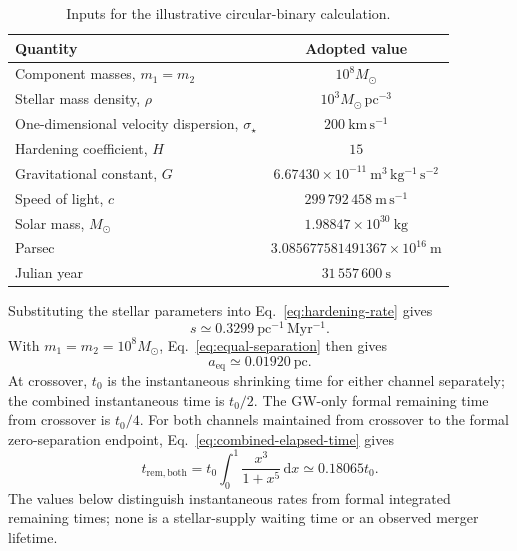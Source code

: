 \documentclass[12pt]{article}
\begin{document}
\begin{table}[ht]
  \centering
  \caption{Inputs for the illustrative circular-binary calculation.}
  \label{tab:inputs}
  \begin{tabular}{lc}
    \toprule
    Quantity & Adopted value \\
    \midrule
    Component masses, $m_1=m_2$ & $10^8 M_\odot$ \\
    Stellar mass density, $\rho$ & $10^3 M_\odot\,\mathrm{pc}^{-3}$ \\
    One-dimensional velocity dispersion, $\sigma_\star$ & $200\ \mathrm{km\,s^{-1}}$ \\
    Hardening coefficient, $H$ & $15$ \\
    Gravitational constant, $G$ & $6.67430\times10^{-11}\ \mathrm{m^3\,kg^{-1}\,s^{-2}}$ \\
    Speed of light, $c$ & $299\,792\,458\ \mathrm{m\,s^{-1}}$ \\
    Solar mass, $M_\odot$ & $1.98847\times10^{30}\ \mathrm{kg}$ \\
    Parsec & $3.085677581491367\times10^{16}\ \mathrm{m}$ \\
    Julian year & $31\,557\,600\ \mathrm{s}$ \\
    \bottomrule
  \end{tabular}
\end{table}

Substituting the stellar parameters into Eq.~\eqref{eq:hardening-rate} gives
\begin{equation}
  s\simeq0.3299\ \mathrm{pc^{-1}\,Myr^{-1}}.
  \label{eq:example-hardening}
\end{equation}
With $m_1=m_2=10^8M_\odot$, Eq.~\eqref{eq:equal-separation} then gives
\begin{equation}
  a_{\mathrm{eq}}\simeq0.01920\ \mathrm{pc}.
  \label{eq:example-separation}
\end{equation}
At crossover, $t_0$ is the instantaneous shrinking time for either channel separately; the combined instantaneous time is $t_0/2$. The GW-only formal remaining time from crossover is $t_0/4$. For both channels maintained from crossover to the formal zero-separation endpoint, Eq.~\eqref{eq:combined-elapsed-time} gives
\begin{equation}
  t_{\mathrm{rem,both}}
  =t_0\int_0^1\frac{x^3}{1+x^5}\,\mathrm{d}x
  \simeq0.18065t_0.
  \label{eq:combined-remaining-time}
\end{equation}
The values below distinguish instantaneous rates from formal integrated remaining times; none is a stellar-supply waiting time or an observed merger lifetime.
\end{document}
